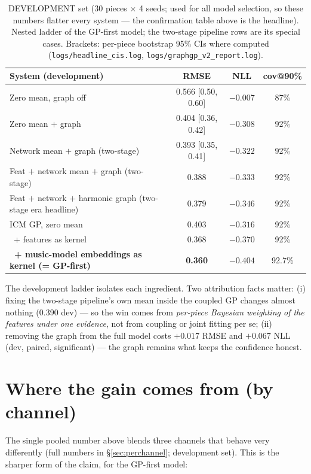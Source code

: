 \documentclass[11pt,a4paper]{report}
\newcommand{\rmseZero}{0.566}
\newcommand{\rmseGraph}{0.404}
\newcommand{\rmseNetGraph}{0.393}      %
\newcommand{\rmseStack}{0.388}         %
\newcommand{\rmseHeadline}{0.379}      %
\newcommand{\nllHeadline}{$-0.346$}
\newcommand{\nllZero}{$-0.007$}
\newcommand{\nllGraph}{$-0.308$}
\newcommand{\nllNetGraph}{$-0.322$}
\newcommand{\nllStack}{$-0.333$}
\newcommand{\covZero}{87\%}
\newcommand{\covHead}{92\%}            %
\newcommand{\nPieces}{30}
\newcommand{\rmseGPdev}{0.360}
\newcommand{\nllGPdev}{$-0.404$}
\newcommand{\rmseGP}{0.376}            %
\begin{document}
\begin{table}[h]\centering
\caption{DEVELOPMENT set (\nPieces{} pieces $\times$ 4 seeds; used for all model
selection, so these numbers flatter every system --- the confirmation table above
is the headline). Nested ladder of the GP-first model; the two-stage pipeline rows
are its special cases. Brackets: per-piece bootstrap 95\% CIs where computed
(\texttt{logs/headline\_cis.log}, \texttt{logs/graphgp\_v2\_report.log}).}
\label{tab:headline-exec}
\footnotesize
\begin{tabular}{lccc}
\toprule
System (development) & RMSE & NLL & cov@90\% \\
\midrule
Zero mean, graph off               & \rmseZero{} {\scriptsize[0.50, 0.60]}    & \nllZero{}   & \covZero \\
Zero mean $+$ graph                & \rmseGraph{} {\scriptsize[0.36, 0.42]}   & \nllGraph{}  & \covHead \\
Network mean $+$ graph (two-stage) & \rmseNetGraph{} {\scriptsize[0.35, 0.41]} & \nllNetGraph{} & \covHead \\
Feat $+$ network mean $+$ graph (two-stage) & \rmseStack{}    & \nllStack{}   & \covHead \\
Feat $+$ network $+$ harmonic graph (two-stage era headline) & \rmseHeadline{} & \nllHeadline{} & \covHead \\
ICM GP, zero mean                  & 0.403 & $-0.316$ & 92\% \\
\ + features as kernel             & 0.368 & $-0.370$ & 92\% \\
\textbf{\ + music-model embeddings as kernel (= GP-first)} & \textbf{\rmseGPdev} & \nllGPdev & 92.7\% \\
\bottomrule
\end{tabular}
\end{table}

\noindent The development ladder isolates each ingredient. Two attribution facts
matter: (i) fixing the two-stage pipeline's own mean inside the coupled GP changes
almost nothing (0.390 dev) --- so the win comes from \emph{per-piece Bayesian
weighting of the features under one evidence}, not from coupling or joint fitting
per se; (ii) removing the graph from the full model costs $+0.017$ RMSE and
$+0.067$ NLL (dev, paired, significant) --- the graph remains what keeps the
confidence honest.

\section{Where the gain comes from (by channel)}
The single pooled number above blends three channels that behave very differently
(full numbers in \S\ref{sec:perchannel}; development set). This is the sharper form
of the claim, for the GP-first model:
\end{document}
